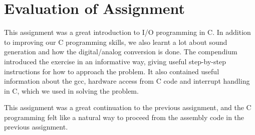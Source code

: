 \section{Evaluation of Assignment}

This assignment was a great introduction to I/O programming in C. In addition to improving our C programming skills, we also learnt a lot about sound generation and how the digital/analog conversion is done. The compendium \cite{eeds-compendium} introduced the exercise in an informative way, giving useful step-by-step instructions for how to approach the problem. It also contained useful information about the gcc, hardware access from C code and interrupt handling in C, which we used in solving the problem.

This assignment was a great continuation to the previous assignment, and the C programming felt like a natural way to proceed from the assembly code in the previous assignment.
